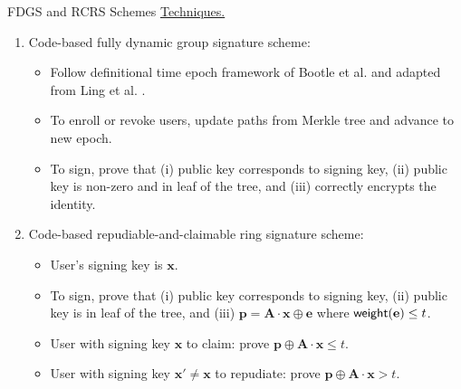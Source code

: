 \begin{frame}{FDGS and RCRS Schemes}
	\underline{Techniques.}
	\begin{enumerate}
		\item Code-based fully dynamic group signature scheme:
		\begin{itemize}
			\item Follow definitional time epoch framework of Bootle et al. \cite{BootleCCGG16} and adapted from Ling et al. \cite{LingNWX17}.
			\item To enroll or revoke users, update paths from Merkle tree and advance to new epoch.
			\item To sign, prove that (i) public key corresponds to signing key, (ii) public key is non-zero and in leaf of the tree, and (iii) correctly encrypts the identity.
		\end{itemize}
		\item Code-based repudiable-and-claimable ring signature scheme:
		\begin{itemize}
			\item User's signing key is $\mathbf{x}$.
			\item To sign, prove that (i) public key corresponds to signing key, (ii) public key is in leaf of the tree, and (iii) $\mathbf{p} = \mathbf{A}\cdot \mathbf{x} \oplus \mathbf{e}$ where $\mathsf{weight}(\mathbf{e}) \leq t$.
			\item User with signing key $\mathbf{x}$ to claim: prove $\mathbf{p} \oplus \mathbf{A}\cdot\mathbf{x} \leq t$. 
			\item User with signing key $\mathbf{x}'\not= \mathbf{x}$ to repudiate: prove $\mathbf{p} \oplus\mathbf{A}\cdot\mathbf{x} > t$.
		\end{itemize}
	\end{enumerate}
\end{frame}